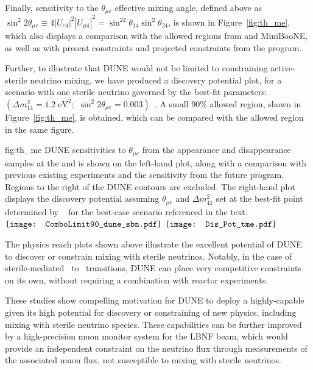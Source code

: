 Finally, sensitivity to the $\theta_{\mu e}$ effective mixing angle, defined above as $\sin^2{2\theta_{\mu e}}\equiv 4|U_{e4}|^2|U_{\mu 4}|^2=\sin^22\theta_{14}\sin^2\theta_{24}$, is shown in Figure~\ref{fig:th_me}, which also displays a comparison with the allowed regions from  and MiniBooNE, as well as with present constraints and projected constraints from the \fnal {} program.

Further, to illustrate that DUNE would not be limited to constraining active-sterile neutrino mixing, we have produced a discovery potential plot, for a scenario with one sterile neutrino governed by the  best-fit parameters: $\left(\Delta m_{14}^2= 1.2\;\text{eV}^2;\,\,\sin^2{2\theta_{\mu e}}=0.003\right)$~\cite{LSNDSterile}. 
A small 90\%  allowed region, shown in Figure~\ref{fig:th_me}, is obtained, which can be compared with the  allowed region in the same figure. 
\begin{dunefigure}
{fig:th_me}
{DUNE sensitivities to $\theta_{\mu e}$ from the appearance and disappearance samples at the  and  is shown on the left-hand plot, along with a comparison with previous existing experiments and the sensitivity from the future  program. Regions to the right of the DUNE contours are excluded. The right-hand plot displays the discovery potential assuming $\theta_{\mu e}$ and $\Delta m_{41}^2$ set at the best-fit point determined by ~\cite{LSNDSterile} for the best-case scenario referenced in the text.}
$\vcenter{\hbox{\texttt{[image: ComboLimit90\_dune\_sbn.pdf]}}}$
$\vcenter{\hbox{\texttt{[image: Dis\_Pot\_tme.pdf]}}}$
\end{dunefigure}



The physics reach plots shown above illustrate the excellent potential of DUNE to discover or constrain mixing with sterile neutrinos. Notably, in the case of sterile-mediated \numu~to \nue~transitions, DUNE can place very competitive constraints on its own, without requiring a combination with reactor experiments. 

These studies show compelling motivation for DUNE to deploy a highly-capable   given its high potential for discovery or constraining of new physics, including mixing with sterile neutrino species. These capabilities can be further improved by a high-precision muon monitor system for the LBNF beam, which would provide an independent constraint on the neutrino flux through measurements of the associated muon flux, not susceptible to mixing with sterile neutrinos.



